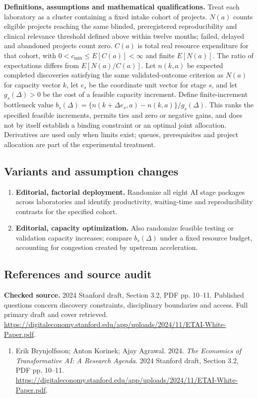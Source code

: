 \documentclass[11pt,a4paper]{article}
\begin{document}
\textbf{Definitions, assumptions and mathematical qualifications.} Treat each laboratory as a cluster containing a fixed intake cohort of projects. \(N(a)\) counts eligible projects reaching the same blinded, preregistered reproducibility and clinical relevance threshold defined above within twelve months; failed, delayed and abandoned projects count zero. \(C(a)\) is total real resource expenditure for that cohort, with \(0<c_{\min}\leq E[C(a)]<\infty\) and finite \(E[N(a)]\). The ratio of expectations differs from \(E[N(a)/C(a)]\). Let \(n(k,a)\) be expected completed discoveries satisfying the same validated-outcome criterion as \(N(a)\) for capacity vector \(k\), let \(e_s\) be the coordinate unit vector for stage \(s\), and let \(g_s(\Delta)>0\) be the cost of a feasible capacity increment. Define finite-increment bottleneck value \(b_s(\Delta)=\{n(k+\Delta e_s,a)-n(k,a)\}/g_s(\Delta)\). This ranks the specified feasible increments, permits ties and zero or negative gains, and does not by itself establish a binding constraint or an optimal joint allocation. Derivatives are used only when limits exist; queues, prerequisites and project allocation are part of the experimental treatment.
\subsection*{Variants and assumption changes}
\begin{enumerate}
\item \textbf{Editorial, factorial deployment.} Randomize all eight AI stage packages across laboratories and identify productivity, waiting-time and reproducibility contrasts for the specified cohort.
\item \textbf{Editorial, capacity optimization.} Also randomize feasible testing or validation capacity increases; compare \(b_s(\Delta)\) under a fixed resource budget, accounting for congestion created by upstream acceleration.
\end{enumerate}
\subsection*{References and source audit}
\textbf{Checked source.} 2024 Stanford draft, Section 3.2, PDF pp. 10--11. Published questions concern discovery constraints, disciplinary boundaries and access. Full primary draft and cover retrieved. \url{https://digitaleconomy.stanford.edu/app/uploads/2024/11/ETAI-White-Paper.pdf}.
\begin{enumerate}\raggedright
\item\hypertarget{definitions:source:30007692:1}{} Erik Brynjolfsson; Anton Korinek; Ajay Agrawal. 2024. \emph{The Economics of Transformative AI: A Research Agenda}. 2024 Stanford draft, Section 3.2, PDF pp. 10--11.
\url{https://digitaleconomy.stanford.edu/app/uploads/2024/11/ETAI-White-Paper.pdf}.
\end{enumerate}
\end{document}
